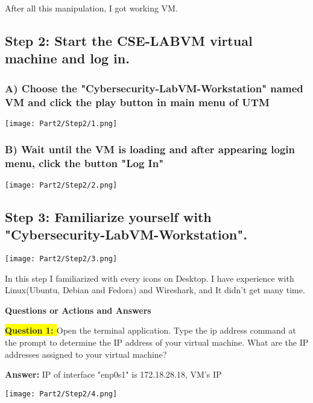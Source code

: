 \documentclass{article}
\begin{document}
\vspace{2\baselineskip}

After all this manipulation, I got working VM.

\newpage
\subsection*{Step 2: Start the CSE-LABVM virtual machine and log in.}

\subsubsection*{A) Choose the "Cybersecurity-LabVM-Workstation" named VM and click the play button in main menu of UTM}
\texttt{[image: Part2/Step2/1.png]}

\subsubsection*{B) Wait until the VM is loading and after appearing login menu, click the button "Log In"}
\texttt{[image: Part2/Step2/2.png]}

\newpage
\subsection*{Step 3: Familiarize yourself with "Cybersecurity-LabVM-Workstation".}

\texttt{[image: Part2/Step2/3.png]}

\vspace{1\baselineskip}

In this step I familiarized with every icons on Desktop. I have experience with Linux(Ubuntu, Debian and Fedora) and Wireshark, and It didn't get many time.

\vspace{1\baselineskip}

\textbf{Questions or Actions and Answers} 

\vspace{1\baselineskip}

\textbf{\colorbox{yellow}{Question 1: }} Open the terminal application. Type the ip address command at the prompt to determine the IP address of your virtual machine. What are the IP addresses assigned to your virtual machine? 

\textbf{Answer: }IP of interface "enp0s1" is 172.18.28.18, VM's IP

\texttt{[image: Part2/Step2/4.png]}
\end{document}
